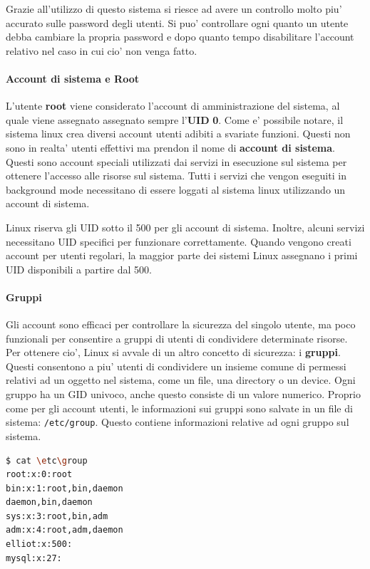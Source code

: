 Grazie all'utilizzo di questo sistema si riesce ad avere un controllo molto piu' accurato sulle password degli utenti. Si puo' controllare ogni quanto un utente debba cambiare la propria password e dopo quanto tempo disabilitare l'account relativo nel caso in cui cio' non venga fatto.

\paragraph{Account di sistema e Root}
L'utente \textbf{root} viene considerato l'account di amministrazione del sistema, al quale viene assegnato  assegnato sempre l'\textbf{UID} \textbf{0}. Come e' possibile notare, il sistema linux crea diversi account utenti adibiti a svariate funzioni. Questi non sono in realta' utenti effettivi ma prendon il nome di  \textbf{account di sistema}. Questi sono account speciali utilizzati dai servizi in esecuzione sul sistema per ottenere l'accesso alle risorse sul sistema. Tutti i servizi che vengon eseguiti in background mode necessitano di essere loggati al sistema linux utilizzando un account di sistema.

Linux riserva gli UID sotto il 500 per gli account di sistema. Inoltre, alcuni servizi necessitano UID specifici per funzionare correttamente. Quando vengono creati account per utenti regolari, la maggior parte dei sistemi Linux assegnano i primi UID disponibili a partire dal 500.

\paragraph{Gruppi}
Gli account sono efficaci per controllare la sicurezza del singolo utente, ma poco funzionali per consentire a gruppi di utenti di condividere determinate risorse. Per ottenere cio', Linux si avvale di un altro concetto di sicurezza: i \textbf{gruppi}. Questi consentono a piu' utenti di condividere un insieme comune di permessi relativi ad un oggetto nel sistema, come un file, una directory o un device. Ogni gruppo ha un GID univoco, anche questo consiste di un valore numerico. Proprio come per gli account utenti, le informazioni sui gruppi sono salvate in un file di sistema: \texttt{/etc/group}. Questo contiene informazioni relative ad ogni gruppo sul sistema.

\begin{lstlisting}[language=bash,basicstyle=\ttfamily,frame=single,caption={Struttura di un file /etc/group},captionpos=b]
$ cat \etc\group
root:x:0:root
bin:x:1:root,bin,daemon
daemon,bin,daemon
sys:x:3:root,bin,adm
adm:x:4:root,adm,daemon
elliot:x:500:
mysql:x:27:
\end{lstlisting}

